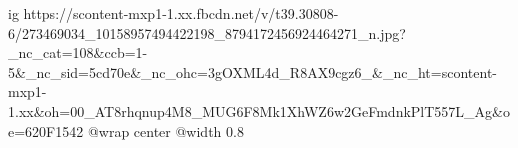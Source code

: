  
 
 
 
 

\ifcmt
  ig https://scontent-mxp1-1.xx.fbcdn.net/v/t39.30808-6/273469034_10158957494422198_8794172456924464271_n.jpg?_nc_cat=108&ccb=1-5&_nc_sid=5cd70e&_nc_ohc=3gOXML4d_R8AX9cgz6_&_nc_ht=scontent-mxp1-1.xx&oh=00_AT8rhqnup4M8_MUG6F8Mk1XhWZ6w2GeFmdnkPlT557L_Ag&oe=620F1542
  @wrap center
  @width 0.8
\fi
